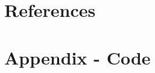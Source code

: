 \documentclass[conference]{IEEEtran}
\begin{document}
\section{References}

\printbibliography

\newpage

\onecolumn

\section{Appendix - Code}

\inputminted{python}{inference_export.py}
\end{document}
